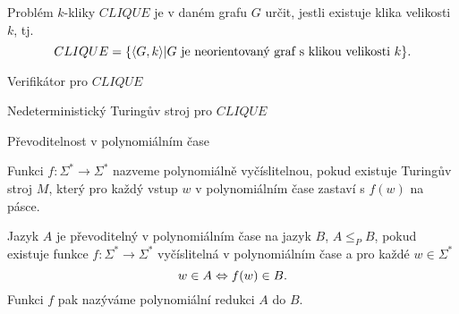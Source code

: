     \begin{frame}%
    \begin{example}[$CLIQUE$ je NP]
    Problém $k$-kliky $CLIQUE$ je v daném grafu $G$ určit, jestli existuje klika velikosti $k$, tj.
    $$CLIQUE=\{\langle G,k\rangle | G \hbox{  je neorientovaný graf s klikou velikosti } k\}\hbox{.}
    $$
    \end{example}
    \pause
    \begin{algbox}{ Verifikátor pro $CLIQUE$}
    \begin{algorithmic}[1]
    \State {}
    \EndProcedure
    \end{algorithmic}
    \end{algbox}
    \pause\begin{algbox}{Nedeterministický Turingův stroj pro $CLIQUE$}
    \begin{algorithmic}[1]
    \State {}
    \EndProcedure
    \end{algorithmic}
    \end{algbox}
    
    \end{frame}
    
    
    
    
    
    \begin{frame}{Převoditelnost v polynomiálním čase}
    \begin{definition}
    Funkci $f: \Sigma^*\to \Sigma^*$ nazveme \alert{polynomiálně vyčíslitelnou}, pokud existuje Turingův stroj $M$, který pro každý vstup $w$ v polynomiálním čase zastaví s $f(w)$ na pásce.
    \pause
    
    Jazyk $A$ je \alert{převoditelný v polynomiálním čase} na jazyk $B$, $A\leq_P B$, pokud existuje funkce $f: \Sigma^*\to \Sigma^*$ vyčíslitelná v polynomiálním čase a pro každé $w\in \Sigma^*$
    $$w\in A \Leftrightarrow f(w)\in B\hbox{.}
    $$
    \pause
    Funkci $f$ pak nazýváme \alert{polynomiální redukci $A$ do $B$}.
    \end{definition}
    
    \end{frame}
    
